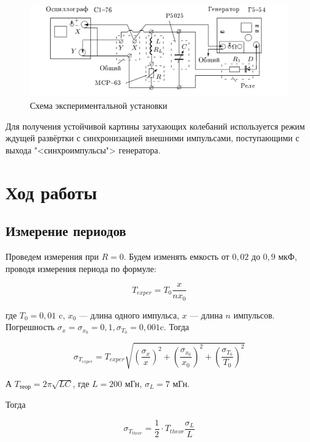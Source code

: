 \documentclass[a4paper, 14pt]{extarticle}
\begin{document}
\begin{figure}[h]
	\includegraphics[width=15cm]{pics/scheme.jpg}
	\caption{Схема экспериментальной установки}
	\label{scheme}
\end{figure}

Для получения устойчивой картины затухающих колебаний используется
режим ждущей развёртки с синхронизацией внешними импульсами,
поступающими с выхода "<синхроимпульсы"> генератора.

\section{Ход работы}

\subsection{Измерение периодов}

Проведем измерения при ${R = 0}$. Будем изменять емкость от ${0,02}$ до ${0,9}$ мкФ, проводя измерения периода по формуле:

\begin{equation}\label{}
T_{exper} = T_0 \frac{x}{nx_0}
\end{equation}

где $ T_0 = 0,01 $ c, $ x_0 $ --- длина одного импульса, $ x $ --- длина $ n $ импульсов. Погрешность $ \sigma_x = \sigma_{x_0} = 0,1, \sigma_{T_0} = 0,001  $c. Тогда 

\begin{equation}\label{}
\sigma_{T_{exper}} = T_{exper}\sqrt{ \left( \frac{ \sigma_x}{x} \right)^2 + \left( \frac{ \sigma_{x_0}}{x_0} \right)^2  +  \left( \frac{ \sigma_{T_0}}{T_0} \right)^2}
\end{equation}

А $ T_{теор} = 2\pi\sqrt{LC} $, где ${L = 200}$ мГн, $ \sigma_L = 7 $ мГн.

Тогда 

\begin{equation}\label{}
	\sigma_{T_{theor}} = \frac{1}{2}\cdot{T_{theor}} \frac{\sigma_L}{L}
\end{equation}
\end{document}
